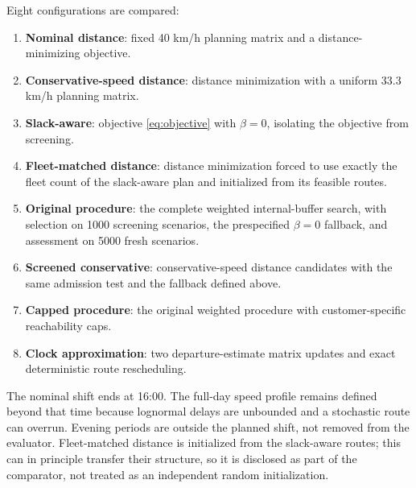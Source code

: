 \documentclass[11pt,a4paper]{article}
\begin{document}
Eight configurations are compared:
\begin{enumerate}
  \item \textbf{Nominal distance}: fixed 40 km/h planning matrix and a
        distance-minimizing objective.
  \item \textbf{Conservative-speed distance}: distance minimization with a
        uniform 33.3 km/h planning matrix.
  \item \textbf{Slack-aware}: objective \eqref{eq:objective} with $\beta=0$,
        isolating the objective from screening.
  \item \textbf{Fleet-matched distance}: distance minimization forced to use
        exactly the fleet count of the slack-aware plan and initialized from
        its feasible routes.
  \item \textbf{Original procedure}: the complete weighted internal-buffer search, with
        selection on 1000 screening scenarios, the prespecified $\beta=0$
        fallback, and assessment on 5000 fresh scenarios.
  \item \textbf{Screened conservative}: conservative-speed distance candidates
        with the same admission test and the fallback defined above.
  \item \textbf{Capped procedure}: the original weighted procedure with
        customer-specific reachability caps.
  \item \textbf{Clock approximation}: two departure-estimate matrix updates
        and exact deterministic route rescheduling.
\end{enumerate}

The nominal shift ends at 16:00. The full-day speed profile remains defined
beyond that time because lognormal delays are unbounded and a stochastic
route can overrun. Evening periods are outside the planned shift, not removed
from the evaluator. Fleet-matched distance is initialized from the slack-aware
routes; this can in principle transfer their structure, so it is disclosed as
part of the comparator, not treated as an independent random initialization.
\end{document}
